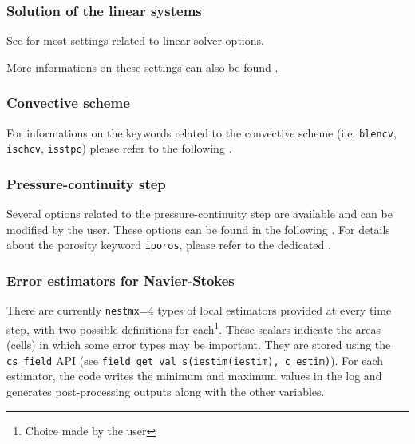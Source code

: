 \subsubsection{Solution of the linear systems}

See 
for most settings related to linear solver options.

More informations on these settings can also be found
.

\subsubsection{Convective scheme}

For informations on the keywords related to the convective scheme
(i.e. \texttt{blencv}, \texttt{ischcv}, \texttt{isstpc}) please
refer to the following .

\subsubsection{Pressure-continuity step}

Several options related to the pressure-continuity step
are available and can be modified by the user. These options
can be found in the following
.
For details about the porosity keyword \texttt{iporos}, please refer to
the dedicated .

\subsubsection{Error estimators for Navier-Stokes}

There are currently {\tt nestmx}=4 types of local estimators
provided at every time step, with two possible definitions for
each\footnote{Choice made by the user}. These scalars indicate the areas
(cells) in which some error types may be important. They are
stored using the \texttt{cs\_field} API (see
\texttt{field\_get\_val\_s(iestim(iestim), c\_estim)}).
For each estimator, the code writes the minimum and maximum values
in the log and generates post-processing outputs along with
the other variables.

